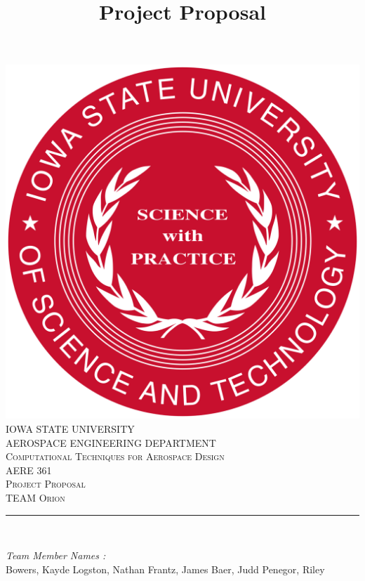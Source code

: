 \documentclass[12pt]{article}
\begin{document}
\title{Project Proposal}

\begin{titlepage}
	\centering
    \vspace*{0.5 cm}
    \includegraphics[scale = 0.11]{isu_seal.png}\\[1.0 cm]	%
    \textsc{\LARGE IOWA STATE UNIVERSITY}\\[2.0 cm]
    \textsc{\large AEROSPACE ENGINEERING DEPARTMENT}\\[0.2 cm]
    \textsc{\large Computational Techniques for Aerospace Design}\\[0.2 cm]
	\textsc{\Large AERE 361}\\[0.5 cm]				%
	\textsc{\Large Project Proposal}\\[0.2 cm]
	\textsc{\Large TEAM Orion}\\[0.2 cm]
	\rule{\linewidth}{0.2 mm} \\[0.4 cm]
	
	
	\begin{minipage}{0.8\textwidth}
		
			\begin{flushleft} 
			\emph{Team Member Names :} \\
			Bowers, Kayde\linebreak
			Logston, Nathan\linebreak
			Frantz, James\linebreak
			Baer, Judd\linebreak
			Penegor, Riley\linebreak
			
		\end{flushleft}
	\end{minipage}\\[2 cm]
	
	\vfill
	
\end{titlepage}
\end{document}

